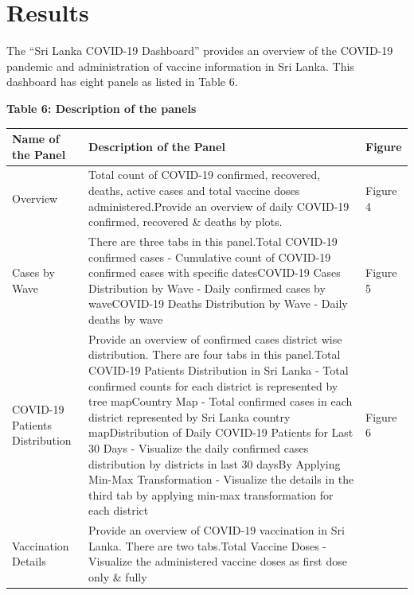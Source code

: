 \documentclass[
]{article}
\begin{document}
\hypertarget{results}{%
\section{Results}\label{results}}

The ``Sri Lanka COVID-19 Dashboard'' provides an overview of the
COVID-19 pandemic and administration of vaccine information in Sri
Lanka. This dashboard has eight panels as listed in Table 6.

\textbf{Table 6: Description of the panels}

\begin{longtable}[]{@{}
  >{\raggedright\arraybackslash}p{}
  >{\raggedright\arraybackslash}p{}
  >{\raggedright\arraybackslash}p{}@{}}
\toprule
\textbf{Name of the Panel} & \textbf{Description of the Panel} &
\textbf{Figure} \\
\midrule
\endhead
Overview & Total count of COVID-19 confirmed, recovered, deaths, active
cases and total vaccine doses administered.\hfill\break Provide an
overview of daily COVID-19 confirmed, recovered \& deaths by
plots.\hfill\break & Figure 4 \\
Cases by Wave & There are three tabs in this panel.\hfill\break  * Total
COVID-19 confirmed cases - Cumulative count of COVID-19 confirmed cases
with specific dates\hfill\break * COVID-19 Cases Distribution by Wave -
Daily confirmed cases by wave\hfill\break * COVID-19 Deaths Distribution
by Wave - Daily deaths by wave\hfill\break & Figure 5 \\
COVID-19 Patients Distribution & Provide an overview of confirmed cases
district wise distribution. There are four tabs in this
panel.\hfill\break * Total COVID-19 Patients Distribution in Sri Lanka -
Total confirmed counts for each district is represented by tree
map\hfill\break * Country Map - Total confirmed cases in each district
represented by Sri Lanka country map\hfill\break * Distribution of Daily
COVID-19 Patients for Last 30 Days - Visualize the daily confirmed cases
distribution by districts in last 30 days\hfill\break * By Applying
Min-Max Transformation - Visualize the details in the third tab by
applying min-max transformation for each district\hfill\break & Figure
6 \\
Vaccination Details & Provide an overview of COVID-19 vaccination in Sri
Lanka. There are two tabs.\hfill\break * Total Vaccine Doses - Visualize
the administered vaccine doses as first dose only \& fully

\end{longtable}
\end{document}
